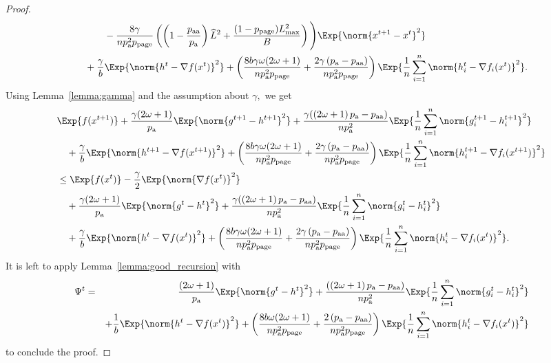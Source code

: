 \documentclass{article}
\newcommand*{\probavailable}{\ensuremath{p_{\textnormal{a}}}}
\newcommand*{\probpairaa}{\ensuremath{p_{\textnormal{aa}}}}
\newcommand*{\probpage}{\ensuremath{p_{\text{page}}}}
\begin{document}
\begin{proof}
\begin{align*}
      &\qquad\quad - \frac{8 \gamma}{n \probavailable^2 \probpage} \left(\left(1 - \frac{\probpairaa}{\probavailable}\right)\widehat{L}^2 + \frac{(1 - \probpage)L_{\max}^2}{B}\right)\Bigg) \Exp{\norm{x^{t+1} - x^t}^2} \\
      &\quad + \frac{\gamma}{b}\Exp{\norm{h^{t} - \nabla f(x^{t})}^2} + \left(\frac{8 b \gamma \omega (2 \omega + 1)}{n \probavailable^2 \probpage} + \frac{2 \gamma \left(\probavailable - \probpairaa\right)}{n \probavailable^2 \probpage}\right)\Exp{\frac{1}{n}\sum_{i=1}^n\norm{h^{t}_i - \nabla f_i(x^{t})}^2}.
    \end{align*}
    Using Lemma~\ref{lemma:gamma} and the assumption about $\gamma,$ we get
    \begin{align*}
      &\Exp{f(x^{t + 1})} + \frac{\gamma (2 \omega + 1)}{\probavailable} \Exp{\norm{g^{t+1} - h^{t+1}}^2} + \frac{\gamma (\left(2 \omega + 1\right)\probavailable - \probpairaa)}{n \probavailable^2} \Exp{\frac{1}{n}\sum_{i=1}^n\norm{g^{t+1}_i - h^{t+1}_i}^2}\\
      &\quad  + \frac{\gamma}{b} \Exp{\norm{h^{t+1} - \nabla f(x^{t+1})}^2} + \left(\frac{8 b \gamma \omega (2 \omega + 1)}{n \probavailable^2 \probpage} + \frac{2 \gamma \left(\probavailable - \probpairaa\right)}{n \probavailable^2 \probpage}\right) \Exp{\frac{1}{n}\sum_{i=1}^n\norm{h^{t+1}_i - \nabla f_i(x^{t+1})}^2}\\
      &\leq \Exp{f(x^t)} - \frac{\gamma}{2}\Exp{\norm{\nabla f(x^t)}^2} \\
      &\quad + \frac{\gamma (2 \omega + 1)}{\probavailable} \Exp{\norm{g^{t} - h^{t}}^2} + \frac{\gamma (\left(2 \omega + 1\right)\probavailable - \probpairaa)}{n \probavailable^2} \Exp{\frac{1}{n}\sum_{i=1}^n\norm{g^{t}_i - h^{t}_i}^2} \\
      &\quad + \frac{\gamma}{b}\Exp{\norm{h^{t} - \nabla f(x^{t})}^2} + \left(\frac{8 b \gamma \omega (2 \omega + 1)}{n \probavailable^2 \probpage} + \frac{2 \gamma \left(\probavailable - \probpairaa\right)}{n \probavailable^2 \probpage}\right)\Exp{\frac{1}{n}\sum_{i=1}^n\norm{h^{t}_i - \nabla f_i(x^{t})}^2}.
    \end{align*}
    It is left to apply Lemma~\ref{lemma:good_recursion} with 
    \begin{eqnarray*}
      \Psi^t &=& \frac{(2 \omega + 1)}{\probavailable} \Exp{\norm{g^{t} - h^{t}}^2} + \frac{(\left(2 \omega + 1\right)\probavailable - \probpairaa)}{n \probavailable^2} \Exp{\frac{1}{n}\sum_{i=1}^n\norm{g^{t}_i - h^{t}_i}^2} \\
      &\quad& + \frac{1}{b}\Exp{\norm{h^{t} - \nabla f(x^{t})}^2} + \left(\frac{8 b \omega (2 \omega + 1)}{n \probavailable^2 \probpage} + \frac{2 \left(\probavailable - \probpairaa\right)}{n \probavailable^2 \probpage}\right)\Exp{\frac{1}{n}\sum_{i=1}^n\norm{h^{t}_i - \nabla f_i(x^{t})}^2}
    \end{eqnarray*}
    to conclude the proof.
  \end{proof}
\end{document}
